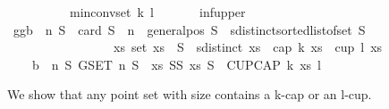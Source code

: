 \begin{isabellebody}
\ \ \ \ \ \ \ \ \ \ {\isachardoublequoteopen}min{\isacharunderscore}{\kern0pt}conv{\isacharunderscore}{\kern0pt}set\ k\ l\ {\isasymnoteq}\ {\isacharbraceleft}{\kern0pt}{\isacharbraceright}{\kern0pt}{\isachardoublequoteclose}\ \isanewline
%
\isadelimproof
\ \ %
\endisadelimproof
%
\isatagproof
{}\isamarkupfalse%
\ inf{\isacharunderscore}{\kern0pt}upper\isanewline
{}\isamarkupfalse%
\isanewline
\ \ \isamarkupfalse%
\ gg{\isacharcolon}{\kern0pt}{\isachardoublequoteopen}{\isacharquery}{\kern0pt}b\ {\isasymin}\ {\isacharbraceleft}{\kern0pt}n{\isachardot}{\kern0pt}\ {\isasymforall}S\ {\isachardot}{\kern0pt}\ {\isacharparenleft}{\kern0pt}card\ S\ {\isacharequal}{\kern0pt}\ n\ {\isasymand}\ general{\isacharunderscore}{\kern0pt}pos\ S\ {\isasymand}\ sdistinct{\isacharparenleft}{\kern0pt}sorted{\isacharunderscore}{\kern0pt}list{\isacharunderscore}{\kern0pt}of{\isacharunderscore}{\kern0pt}set\ S{\isacharparenright}{\kern0pt}{\isacharparenright}{\kern0pt}\isanewline
\ \ \ \ \ \ \ \ \ \ \ \ \ \ \ \ {\isasymlongrightarrow}\ {\isacharparenleft}{\kern0pt}{\isasymexists}xs{\isachardot}{\kern0pt}\ set\ xs\ {\isasymsubseteq}\ S\ {\isasymand}\ sdistinct\ xs\ {\isasymand}\ {\isacharparenleft}{\kern0pt}cap\ k\ xs\ {\isasymor}\ cup\ l\ xs{\isacharparenright}{\kern0pt}{\isacharparenright}{\kern0pt}{\isacharbraceright}{\kern0pt}{\isachardoublequoteclose}\ \ \isanewline
\ \ \ {\isacharparenleft}{\kern0pt}\ {\isachardoublequoteopen}{\isacharquery}{\kern0pt}b\ {\isasymin}\ {\isacharbraceleft}{\kern0pt}n{\isachardot}{\kern0pt}\ {\isasymforall}S{\isachardot}{\kern0pt}\ {\isacharquery}{\kern0pt}GSET\ n\ S\ {\isasymlongrightarrow}\ {\isacharparenleft}{\kern0pt}{\isasymexists}xs{\isachardot}{\kern0pt}\ {\isacharquery}{\kern0pt}SS\ xs\ S\ {\isasymand}\ {\isacharquery}{\kern0pt}CUPCAP\ k\ xs\ l{\isacharparenright}{\kern0pt}{\isacharbraceright}{\kern0pt}{\isachardoublequoteclose}{\isacharparenright}{\kern0pt}\isanewline
\isanewline
\ \ \isamarkupfalse%
%
\begin{isamarkuptext}%
We show that any point set with size  contains a k-cap or an l-cup.%

\end{isamarkuptext}
\end{isabellebody}
